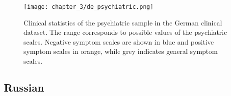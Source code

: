 \begin{table}[ht]
\captionsetup{width=\textwidth}
\caption[German Clinical Dataset: Psychiatric Scores]{\label{tab:data:de:sample:psy} Clinical statistics of the psychiatric sample in the German clinical dataset. Standard deviation is provided in parenthesis for each mean value. The range is provided for the possible values of the psychiatric scales. \\ ``edu\_years'' indicates years of education.}
\end{table}

\begin{figure}[ht]
\begin{center}
 \texttt{[image: chapter\_3/de\_psychiatric.png]}  
\captionsetup{width=\textwidth}
\caption[German Clinical Dataset: Psychiatric Scores]{\label{fig:data:de:sample:psy} Clinical statistics of the psychiatric sample in the German clinical dataset. The range corresponds to possible values of the psychiatric scales. Negative symptom scales are shown in blue and positive symptom scales in orange, while grey indicates general symptom scales.}
\end{center}
\end{figure}

\subsection{Russian}
\label{sec:methods:data:clinical:russian}

